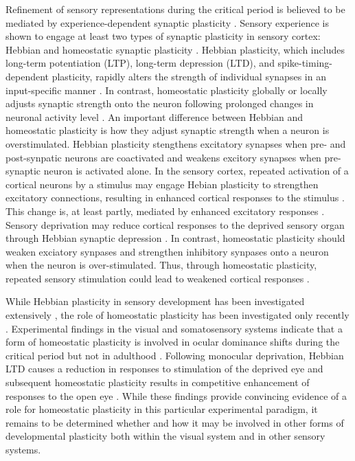 Refinement of sensory representations during the critical period is believed to be mediated by experience-dependent synaptic plasticity \cite{Dan2006, Feldman2009}. Sensory experience is shown to engage at least two types of synaptic plasticity in sensory cortex: Hebbian and homeostatic synaptic plasticity \cite{Desai2002, Fu2002, Heynen2003, Crozier2007, Goel2007, Maffei2008}. Hebbian plasticity, which includes long-term potentiation (LTP), long-term depression (LTD), and spike-timing­-dependent plasticity, rapidly alters the strength of individual synapses in an input-specific manner \cite{Zhang1998, Abbott2000, Malenka2004, Dan2006}. In contrast, homeostatic plasticity globally or locally adjusts synaptic strength onto the neuron following prolonged changes in neuronal activity level \cite{Davis2001, Burrone2003, Turrigiano2004, Hou2008}. An important difference between Hebbian and homeostatic plasticity is how they adjust synaptic strength when a neuron is overstimulated. Hebbian plasticity stengthens excitatory synapses when pre- and post-synpatic neurons are coactivated and weakens excitory synapses when pre-synaptic neuron is activated alone. In the sensory cortex, repeated activation of a cortical neurons by a stimulus may engage Hebian plasticity to strengthen excitatory connections, resulting in enhanced cortical responses to the stimulus \cite{Zhang2001}. This change is, at least partly, mediated by enhanced excitatory responses \cite{Froemke2007, Sun2010}. Sensory deprivation may reduce cortical responses to the deprived sensory organ through Hebbian synaptic depression \cite{Heynen2003}. In contrast, homeostatic plasticity should weaken exciatory synpases and strengthen inhibitory synpases onto a neuron when the neuron is over-stimulated. Thus, through homeostatic plasticity, repeated sensory stimulation could lead to weakened cortical responses \cite{Condon1991, Pienkowski2012}.

While Hebbian plasticity in sensory development has been investigated extensively \cite{Feldman2009}, the role of homeostatic plasticity has been investigated only recently \cite{Mrsic-Flogel2007}. Experimental findings in the visual and somatosensory systems indicate that a form of homeostatic plasticity is involved in ocular dominance shifts during the critical period but not in adulthood \cite{Kaneko2008, Ranson2012}. Following monocular deprivation, Hebbian LTD causes a reduction in responses to stimulation of the deprived eye and subsequent homeostatic plasticity results in competitive enhancement of responses to the open eye \cite{Frenkel2004, Kaneko2008, Ranson2012}. While these findings provide convincing evidence of a role for homeostatic plasticity in this particular experimental paradigm, it remains to be determined whether and how it may be involved in other forms of developmental plasticity both within the visual system and in other sensory systems.


